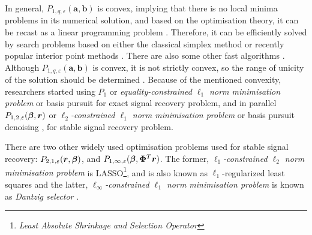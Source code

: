 In general, $P_{1,q,\varepsilon}(\boldsymbol{a},\boldsymbol{b})$ is convex, implying that there is no local minima problems in its numerical solution, and based on the optimisation theory, it can be recast as a linear programming problem \cite{Gill1990,Bertsekas1999,Chen2001}. 
Therefore, it can be efficiently solved by search problems based on either the classical simplex method or recently popular interior point methods \cite{Wyner1979,Bertsekas2003,Boyd2004}.
There are also some other fast algorithms \cite{Cormode2006,Gilbert2006,Gilbert2007,Xu2007a}.
Although $P_{1,q,\varepsilon}(\boldsymbol{a},\boldsymbol{b})$ is convex, it is not strictly convex, so the range of unicity of the solution should be determined \cite{Gribonval2003}.
Because of the mentioned convexity, researchers started using $P_1$ or \emph{equality-constrained $\ell_1$ norm minimisation problem} or basis pursuit \cite{Chen2001,Donoho2003,Cand`es2005b} %
for exact signal recovery problem, and in parallel $P_{1,2,\varepsilon}(\boldsymbol{\beta},\boldsymbol{r})$ or \emph{$\ell_2$-constrained $\ell_1$ norm minimisation problem} or basis pursuit denoising \cite{Chen2001,Donoho2006a,Tropp2006},  %
for stable signal recovery problem.

There are two other widely used optimisation problems used for stable signal recovery: $P_{2,1,\varepsilon}(\boldsymbol{r},\boldsymbol{\beta})$, and $P_{1,\infty,\varepsilon}(\boldsymbol{\beta}, \boldsymbol{\Phi} ^ T\boldsymbol{r})$. 
The former, \emph{$\ell_1$-constrained $\ell_2$ norm minimisation problem} is LASSO\footnote{\emph{Least Absolute Shrinkage and Selection Operator}}, and  is also known as $\ell_1$-regularized least squares \cite{Tibshirani1994,Tropp2006,Koh2007,Meinshausen2009} and the latter, \emph{$\ell_\infty$-constrained $\ell_1$ norm minimisation problem} is known as \emph{Dantzig selector} \cite{Cand`es2007a,Cai2009,Cai2010}.